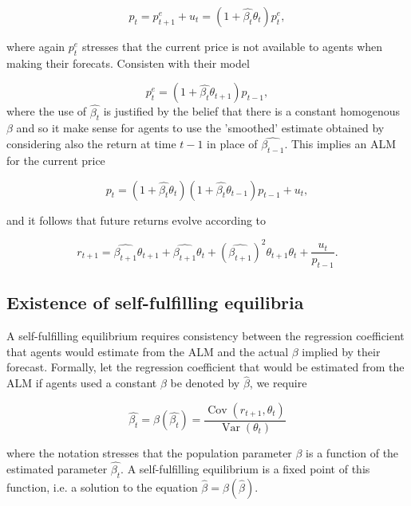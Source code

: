 \documentclass[11pt]{article}
\begin{document}
\begin{equation}
p_t = p^{e}_{t+1} + u_t = (1 + \hat{\beta_t} \theta_t) p^e_{t},
\end{equation}

where again $p^e_{t}$ stresses that the current price is not available to agents when making their forecats.
Consisten with their model

\begin{equation}
p^e_t = (1 +\hat{\beta_t} \theta_{t+1}) p_{t-1},
\end{equation}
where the use of $\hat{\beta_t}$ is justified by the belief that there is a constant homogenous $\beta$ and so it make sense for agents to use the 'smoothed' estimate obtained by considering also the return at time $t-1$ in place of $\hat{\beta_{t-1}}$.
This implies an ALM for the current price

\begin{equation}
p_t = (1 + \hat{\beta_t} \theta_t)(1 + \hat{\beta_t} \theta_{t-1}) p_{t-1} + u_t,
\end{equation}

and it follows that future returns evolve according to 

\begin{equation}
r_{t+1} = \hat{\beta_{t+1}} \theta_{t+1} + \hat{\beta_{t+1}} \theta_t + (\hat{\beta_{t+1}})^2 \theta_{t+1} \theta_t + \frac{u_t}{p_{t-1}}.
\end{equation}

\subsection{Existence of self-fulfilling equilibria}

A self-fulfilling equilibrium requires consistency between the regression coefficient that agents would estimate from the ALM and the actual $\beta$ implied by their forecast. 
Formally, let the regression coefficient that would be estimated from the ALM if agents used a constant $\beta$ be denoted by $\hat{\beta}$, we require

\begin{equation}
\hat{\beta_t} =  \beta(\hat{\beta_t}) = \frac{\operatorname{Cov}(r_{t+1},\theta_t)}{\operatorname{Var}(\theta_t)}
\end{equation}

where the notation stresses that the population parameter $\beta$ is a function of the estimated parameter $\hat{\beta_t}$.
A self-fulfilling equilibrium is a fixed point of this function, i.e. a solution to the equation $\hat{\beta} = \beta(\hat{\beta})$.
\end{document}
